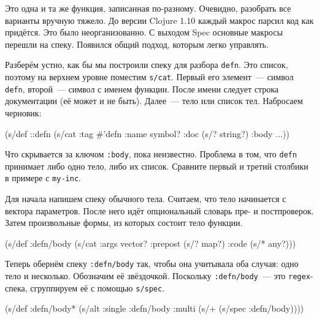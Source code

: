 \fi

Это одна и та же функция, записанная по-разному. Очевидно, разобрать все
варианты вручную тяжело. До версии Clojure 1.10 каждый макрос парсил код как
придётся. Это было неорганизованно. С выходом Spec основные макросы перешли на
спеку. Появился общий подход, которым легко управлять.


Разберём устно, как бы мы построили спеку для разбора \verb|defn|. Это список,
поэтому на верхнем уровне поместим \verb|s/cat|. Первый его элемент~--- символ
\verb|defn|, второй~--- символ с именем функции. После имени следует строка
документации (её может и не быть). Далее~--- тело или список тел. Набросаем
черновик:

\begin{english}
  \begin{clojure}
(s/def ::defn
  (s/cat :tag #{'defn}
         :name symbol?
         :doc (s/? string?)
         :body ...))
  \end{clojure}
\end{english}

Что скрывается за ключом \verb|:body|, пока неизвестно. Проблема в том, что
\verb|defn| принимает либо одно тело, либо их список. Сравните первый и третий
столбики в примере с \verb|my-inc|.

Для начала напишем спеку обычного тела. Считаем, что тело начинается с вектора
параметров. После него идёт опциональный словарь пре- и постпроверок. Затем
произвольные формы, из которых состоит тело функции.

\begin{english}
  \begin{clojure}
(s/def :defn/body
  (s/cat :args vector?
         :prepost (s/? map?)
         :code (s/* any?)))
  \end{clojure}
\end{english}

Теперь обернём спеку \verb|:defn/body| так, чтобы она учитывала оба
случая: одно тело и несколько. Обозначим её звёздочкой. Поскольку
\verb|:defn/body|~--- это \verb|regex|-спека, сгруппируем её с помощью
\verb|s/spec|.

\ifx\devicetype\mobile

\begin{english}
  \begin{clojure}
(s/def :defn/body*
  (s/alt :single :defn/body
         :multi (s/+
                  (s/spec :defn/body))))
  \end{clojure}
\end{english}

